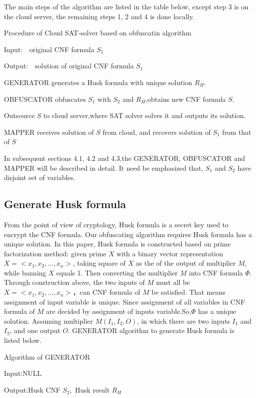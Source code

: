 \documentclass[runningheads,a4paper]{llncs}
\begin{document}
The main steps of the algorithm are listed in the table below, except step 3 is on the cloud server, the remaining steps 1, 2 and 4 is done locally.

\noindent Procedure of Cloud SAT-solver based on obfuscatin algorithm

\noindent Input:~~original CNF formula $S_1$  

\noindent Output:~~solution of original CNF formula $S_1$ 

 GENERATOR generates a Husk formula with unique solution $R_H$.

 OBFUSCATOR obfuscates $S_1$  with $S_2$ and $R_H$,obtains new CNF formula $S$.

 Outsource $S$ to cloud server,where SAT solver solves it and outputs its solution. 

 MAPPER receives solution of $S$ from cloud, and recovers solution of $S_1$ from that of $S$ 

In subsequent sections 4.1, 4.2 and 4.3,the GENERATOR, OBFUSCATOR and MAPPER will be described in detail. 
It need be emphasized that, $S_1$  and $S_2$ have disjoint set of variables.
\subsection{Generate Husk formula}
From the point of view of cryptology, Husk formula is a secret key used to encrypt the CNF formula. 
Our obfuscating algorithm requires Husk formula has a unique solution.
In this paper, Husk formula is constructed based on prime factorization method:
given prime $X$ with a binary vector representation $X = <x_1,x_2,\dots,x_n>$, 
taking square of $X$ as the of the output of multiplier $M$, while banning $X$ equals 1.
Then converting the multiplier $M$ into CNF formula $\Phi$.
Through construction above, the two inputs of $M$ must all be $X = <x_1,x_2,\dots,x_n>$，can CNF formula of $M$ be satisfied.
That means assignment of input variable is unique.
Since assignment of all variables in CNF formula of $M$ are decided by assignment of inputs variable.So,$\Phi$ has a unique solution. 
Assuming multiplier $M (I_1, I_2, O)$, in which there are two inputs $I_1$ and $I_2$, and one output $O$.
GENERATOR algorithm to generate Husk formula is listed below.

\noindent Algorithm of GENERATOR

Input:NULL

Output:Husk CNF $S_2$,~Husk result $R_H$
\end{document}
